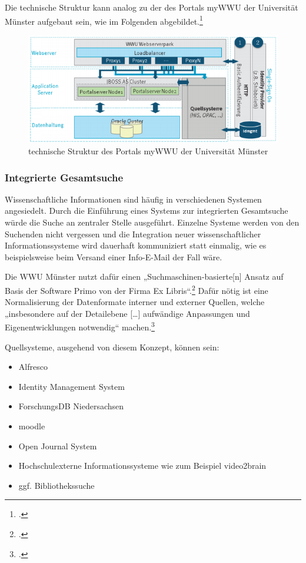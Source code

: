 Die technische Struktur kann analog zu der des Portals myWWU der Universität Münster aufgebaut sein, wie im Folgenden abgebildet.\footcite[Vgl.][165]{vogl_fortschritte_2012}
\begin{figure}[h!]
	\centering
	\includegraphics[width=\textwidth]{kapitel/gruppe3/bilder/struktur_mywwu}
	\caption{technische Struktur des Portals myWWU der Universität Münster}
	\label{fig_struktur_mywwu}
\end{figure}
\newpage

\subsubsection{Integrierte Gesamtsuche}
\label{subsubsection_integrierte_gesamtsuche}
Wissenschaftliche Informationen sind häufig in verschiedenen Systemen angesiedelt. Durch die Einführung eines Systems zur integrierten Gesamtsuche würde die Suche an zentraler Stelle ausgeführt. Einzelne Systeme werden von den Suchenden nicht vergessen und die Integration neuer wissenschaftlicher Informationssysteme wird dauerhaft kommuniziert statt einmalig, wie es beispielsweise beim 
Versand einer Info-E-Mail der Fall wäre.

Die WWU Münster nutzt dafür einen „Suchmaschinen-basierte[n] Ansatz auf Basis der Software Primo von der Firma Ex Libris“.\footcite[Vgl.][41]{vogl_fortschritte_2012} Dafür nötig ist eine Normalisierung der Datenformate interner und externer Quellen, welche „insbesondere auf der Detailebene […] aufwändige Anpassungen und Eigenentwicklungen notwendig“ machen.\footcite[Vgl.][42]{vogl_fortschritte_2012}

Quellsysteme, ausgehend von diesem Konzept, können sein:
\begin{itemize}
	\item Alfresco
	\item Identity Management System
	\item ForschungsDB Niedersachsen
	\item moodle
	\item Open Journal System
	\item Hochschulexterne Informationssysteme wie zum Beispiel video2brain
	\item ggf. Bibliothekssuche
\end{itemize}

